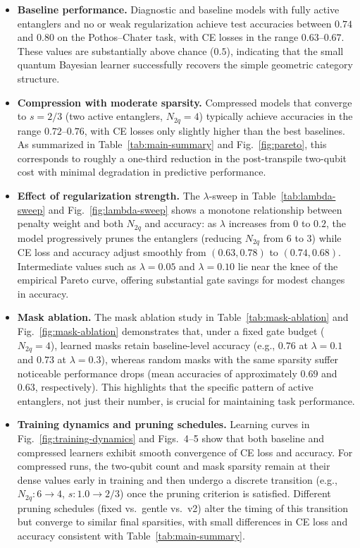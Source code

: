 \documentclass[conference]{IEEEtran}
\begin{document}
\begin{itemize}
    \item \textbf{Baseline performance.} Diagnostic and baseline models with fully active entanglers and no or weak regularization achieve test accuracies between $0.74$ and $0.80$ on the Pothos--Chater task, with CE losses in the range $0.63$--$0.67$. These values are substantially above chance ($0.5$), indicating that the small quantum Bayesian learner successfully recovers the simple geometric category structure.

    \item \textbf{Compression with moderate sparsity.} Compressed models that converge to $s = 2/3$ (two active entanglers, $N_{2q}=4$) typically achieve accuracies in the range $0.72$--$0.76$, with CE losses only slightly higher than the best baselines. As summarized in Table~\ref{tab:main-summary} and Fig.~\ref{fig:pareto}, this corresponds to roughly a one-third reduction in the post-transpile two-qubit cost with minimal degradation in predictive performance.

    \item \textbf{Effect of regularization strength.} The $\lambda$-sweep in Table~\ref{tab:lambda-sweep} and Fig.~\ref{fig:lambda-sweep} shows a monotone relationship between penalty weight and both $N_{2q}$ and accuracy: as $\lambda$ increases from $0$ to $0.2$, the model progressively prunes the entanglers (reducing $N_{2q}$ from $6$ to $3$) while CE loss and accuracy adjust smoothly from $(0.63,0.78)$ to $(0.74,0.68)$. Intermediate values such as $\lambda = 0.05$ and $\lambda = 0.10$ lie near the knee of the empirical Pareto curve, offering substantial gate savings for modest changes in accuracy.

    \item \textbf{Mask ablation.} The mask ablation study in Table~\ref{tab:mask-ablation} and Fig.~\ref{fig:mask-ablation} demonstrates that, under a fixed gate budget ($N_{2q}=4$), learned masks retain baseline-level accuracy (e.g., $0.76$ at $\lambda=0.1$ and $0.73$ at $\lambda=0.3$), whereas random masks with the same sparsity suffer noticeable performance drops (mean accuracies of approximately $0.69$ and $0.63$, respectively). This highlights that the specific pattern of active entanglers, not just their number, is crucial for maintaining task performance.

    \item \textbf{Training dynamics and pruning schedules.} Learning curves in Fig.~\ref{fig:training-dynamics} and Figs.~4--5 show that both baseline and compressed learners exhibit smooth convergence of CE loss and accuracy. For compressed runs, the two-qubit count and mask sparsity remain at their dense values early in training and then undergo a discrete transition (e.g., $N_{2q}: 6 \rightarrow 4$, $s: 1.0 \rightarrow 2/3$) once the pruning criterion is satisfied. Different pruning schedules (fixed vs.\ gentle vs.\ v2) alter the timing of this transition but converge to similar final sparsities, with small differences in CE loss and accuracy consistent with Table~\ref{tab:main-summary}.


\end{itemize}
\end{document}

